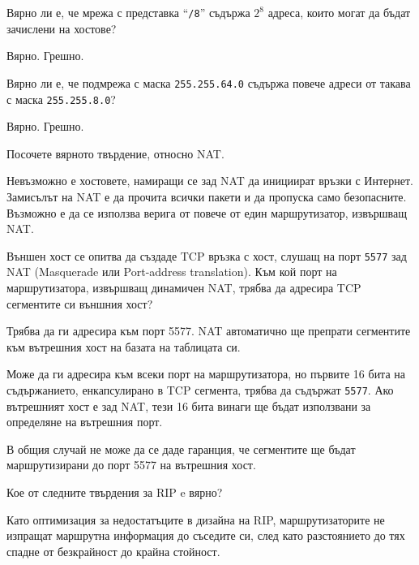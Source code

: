 \begin{questions}
  \question[6] Вярно ли е, че мрежа с представка "`\texttt{/8}"' съдържа
  $2^8$ адреса, които могат да бъдат зачислени на хостове?
  \begin{oneparchoices}
    \choice Вярно.
    \CorrectChoice Грешно.
  \end{oneparchoices}

  \question[6] Вярно ли е, че подмрежа с маска \texttt{255.255.64.0} съдържа
  повече адреси от такава с маска \texttt{255.255.8.0}?

  \begin{oneparchoices}
    \choice Вярно.
    \CorrectChoice Грешно.
  \end{oneparchoices}

  \question[6] Посочете вярното твърдение, относно NAT.
  \begin{choices}
    \choice Невъзможно е хостовете, намиращи се зад NAT да инициират връзки с Интернет.
    \choice Замисълът на NAT е да прочита всички пакети и да пропуска само безопасните.
    \CorrectChoice Възможно е да се използва верига от повече от един
    маршрутизатор, извършващ NAT.
  \end{choices}

  \question[6] Външен хост се опитва да създаде TCP връзка с хост, слушащ на
  порт \texttt{5577} зад NAT (\foreignlanguage{english}{Masquerade} или
  \foreignlanguage{english}{Port-address translation}). Към кой порт на
  маршрутизатора, извършващ динамичен NAT, трябва да адресира TCP сегментите си
  външния хост?

  \begin{choices}
    \choice Трябва да ги адресира към порт 5577. NAT автоматично ще препрати
    сегментите към вътрешния хост на базата на таблицата си.

    \choice Може да ги адресира към всеки порт на маршрутизатора, но първите 16
    бита на съдържанието, енкапсулирано в TCP сегмента, трябва да съдържат
    \texttt{5577}. Ако вътрешният хост е зад NAT, тези 16 бита винаги ще бъдат
    използвани за определяне на вътрешния порт.

    \CorrectChoice В общия случай не може да се даде гаранция, че сегментите ще
    бъдат маршрутизирани до порт 5577 на вътрешния хост.
  \end{choices}

  \question[6] Кое от следните твърдения за RIP e вярно?

  \begin{choices}
    \choice Като оптимизация за недостатъците в дизайна на RIP, маршрутизаторите
    не изпращат маршрутна информация до съседите си, след като разстоянието до
    тях спадне от безкрайност до крайна стойност.


\end{choices}
\end{questions}

